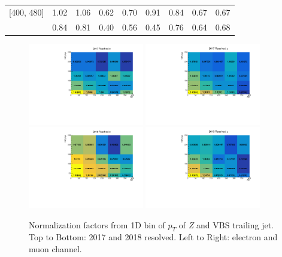 \begin{table}
\begin{tabular}{lcccccccc}
    [400, 480]             & 1.02                         & 1.06                        & 0.62                     & 0.70                     & 0.91    & 0.84      & 0.67    & 0.67      \\\relax
    [480, inf]             & 0.84                         & 0.81                        & 0.40                     & 0.56                     & 0.45    & 0.76      & 0.64    & 0.68      \\
    \bottomrule
  \end{tabular}\label{tab:norm-factors}
\end{table}

\begin{figure}
  \centering
  \includegraphics[width=0.45\textwidth]{analysis_plots/dyjet_norm_2d/cr_vjets_e_sf_from_2017_zjj.pdf}
  \includegraphics[width=0.45\textwidth]{analysis_plots/dyjet_norm_2d/cr_vjets_mu_sf_from_2017_zjj.pdf}\\
  \includegraphics[width=0.45\textwidth]{analysis_plots/dyjet_norm_2d/cr_vjets_e_sf_from_2018_zjj.pdf}
  \includegraphics[width=0.45\textwidth]{analysis_plots/dyjet_norm_2d/cr_vjets_mu_sf_from_2018_zjj.pdf}
  \caption[Normalization factors from 1D bin of \( p_T \) of \textit{Z}
    and VBS trailing jet]%
  {Normalization factors from 1D bin of \( p_T \) of \textit{Z}
    and VBS trailing jet. Top to Bottom: 2017 and 2018 resolved.
    Left to Right: electron and muon channel.}%
  \label{fig:norm-factors-2d}
\end{figure}


